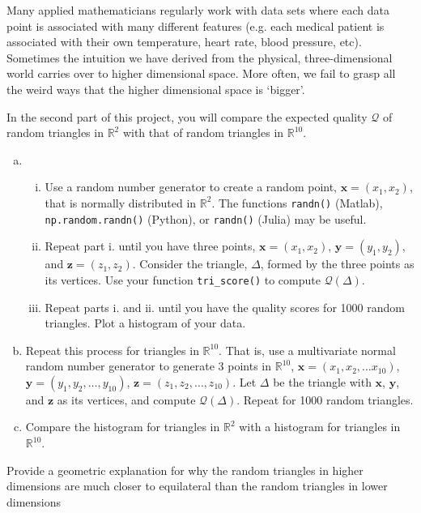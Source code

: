 Many applied mathematicians regularly work with data sets where each data point is associated with many different features (e.g. each medical patient is associated with their own temperature, heart rate, blood pressure, etc). 
Sometimes the intuition we have derived from the physical, three-dimensional world carries over to higher dimensional space. More often, we fail to grasp all the weird ways that the higher dimensional space is `bigger'. 

In the second part of this project, you will compare the expected quality $\mathcal{Q}$ of random triangles in $\mathbb{R}^2$ with that of random triangles in $\mathbb{R}^{10}$.
\begin{enumerate}[(a)]
  \item 
  \begin{enumerate}[i.]
    \item Use a random number generator to create a random point, \(\bm{x} = (x_1,x_2)\), that is normally distributed in $\mathbb{R}^2$. The functions \texttt{randn()} (Matlab), \texttt{np.random.randn()} (Python), or \texttt{randn()} (Julia) may be useful.
    \item Repeat part i. until you have three points, $\bm{x} = (x_1,x_2)$, \(\bm{y} = (y_1,y_2)\), and \(\bm{z} = (z_1,z_2)\). Consider the triangle, $\Delta$, formed by the three points as its vertices. Use your function \texttt{tri\_score()} to compute $\mathcal{Q}(\Delta)$.
    \item Repeat parts i. and ii. until you have the quality scores for 1000 random triangles. Plot a histogram of your data.
  \end{enumerate}
  \item Repeat this process for triangles in $\mathbb{R}^{10}$. That is, use a multivariate normal random number generator to generate 3 points in $\mathbb{R}^{10}$, $\bm{x} = (x_1,x_2,\dots x_{10})$, $\bm{y} = (y_1,y_2,\dots,y_{10})$, $\bm{z} = (z_1,z_2, \dots, z_{10})$. Let $\Delta$ be the triangle with $\bm{x}$, $\bm{y}$, and $\bm{z}$ as its vertices, and compute $\mathcal{Q}(\Delta)$. Repeat for 1000 random triangles.
 \item Compare the histogram for triangles in $\mathbb{R}^2$ with a histogram for triangles in $\mathbb{R}^{10}$. 
\end{enumerate}
Provide a geometric explanation for why the random triangles in higher dimensions are much closer to equilateral than the random triangles in lower dimensions

